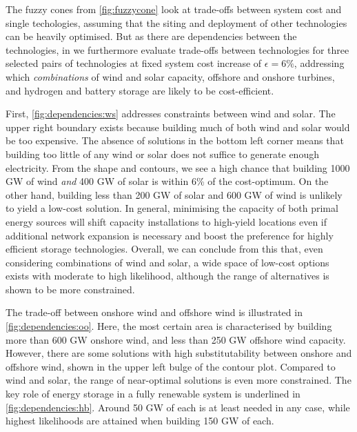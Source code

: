 The fuzzy cones from \cref{fig:fuzzycone} look at trade-offs between system cost
and single techologies, assuming that the siting and deployment of other
technologies can be heavily optimised. But as there are dependencies between the
technologies, in  we
furthermore evaluate trade-offs between technologies for three selected pairs of technologies at
fixed system cost increase of $\epsilon=6\%$, addressing which
\textit{combinations} of wind and solar capacity, offshore and onshore turbines,
and hydrogen and battery storage are likely to be cost-efficient.

First, \cref{fig:dependencies:ws} addresses constraints between wind and solar.
The upper right boundary exists because building much of both wind and solar
would be too expensive. The absence of solutions in the bottom left corner means
that building too little of any wind or solar does not suffice to generate
enough electricity. From the shape and contours, we see a high chance that
building 1000 GW of wind \textit{and} 400 GW of solar is within 6\% of the
cost-optimum. On the other hand, building less than 200 GW of solar and 600 GW
of wind is unlikely to yield a low-cost solution. In general, minimising the
capacity of both primal energy sources will shift capacity installations to
high-yield locations even if additional network expansion is necessary and boost
the preference for highly efficient storage technologies. Overall, we can
conclude from this that, even considering combinations of wind and solar, a wide
space of low-cost options exists with moderate to high likelihood, although the
range of alternatives is shown to be more constrained.

The trade-off between onshore wind and offshore wind is illustrated in
\cref{fig:dependencies:oo}. Here, the most certain area is characterised by
building more than 600 GW onshore wind, and less than 250 GW offshore wind
capacity. However, there are some solutions with high substitutability between
onshore and offshore wind, shown in the upper left bulge of the contour plot.
Compared to wind and solar, the range of near-optimal solutions is even more
constrained. The key role of energy storage in a fully renewable system is
underlined in \cref{fig:dependencies:hb}. Around 50 GW of each is at least
needed in any case, while highest likelihoods are attained when building 150 GW
of each.


